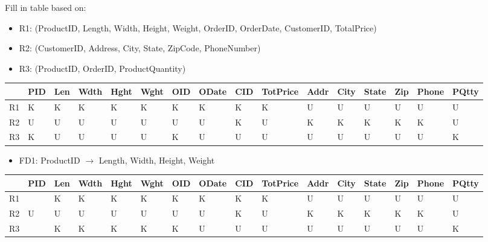 \documentclass[a4paper]{article}
\begin{document}
Fill in table based on:
\begin{itemize}
    \item R1: (ProductID, Length, Width, Height, Weight, OrderID, OrderDate, CustomerID, TotalPrice)
    \item R2: (CustomerID, Address, City, State, ZipCode, PhoneNumber)
    \item R3: (ProductID, OrderID, ProductQuantity)
\end{itemize}

\begin{table}[htb]
\begin{tabular}{|l|l|l|l|l|l|l|l|l|l|l|l|l|l|l|l|}
\hline
   & PID & Len & Wdth & Hght & Wght & OID & ODate & CID & TotPrice & Addr & City & State & Zip & Phone & PQtty \\ \hline
R1 & K   & K   & K    & K    & K    & K   & K     & K   & K        & U    & U    & U     & U   & U     & U     \\ \hline
R2 & U   & U   & U    & U    & U    & U   & U     & K   & U        & K    & K    & K     & K   & K     & U     \\ \hline
R3 & K   & U   & U    & U    & U    & K   & U     & U   & U        & U    & U    & U     & U   & U     & K     \\ \hline
\end{tabular}
\end{table}

\begin{itemize}
    \item FD1: ProductID $\rightarrow$ Length, Width, Height, Weight
\end{itemize}


\begin{table}[htb]
\begin{tabular}{|l|l|l|l|l|l|l|l|l|l|l|l|l|l|l|l|}
\hline
   & PID                                              & Len                      & Wdth                     & Hght                     & Wght                     & OID & ODate & CID & TotPrice & Addr & City & State & Zip & Phone & PQtty \\ \hline
R1 & \cellcolor[HTML]{FFFC9E}{\color[HTML]{FE0000} K} & K                        & K                        & K                        & K                        & K   & K     & K   & K        & U    & U    & U     & U   & U     & U     \\ \hline
R2 & U                                                & U                        & U                        & U                        & U                        & U   & U     & K   & U        & K    & K    & K     & K   & K     & U     \\ \hline
R3 & \cellcolor[HTML]{FFFC9E}{\color[HTML]{FE0000} K} & {\color[HTML]{FE0000} K} & {\color[HTML]{FE0000} K} & {\color[HTML]{FE0000} K} & {\color[HTML]{FE0000} K} & K   & U     & U   & U        & U    & U    & U     & U   & U     & K     \\ \hline
\end{tabular}
\end{table}
\end{document}

